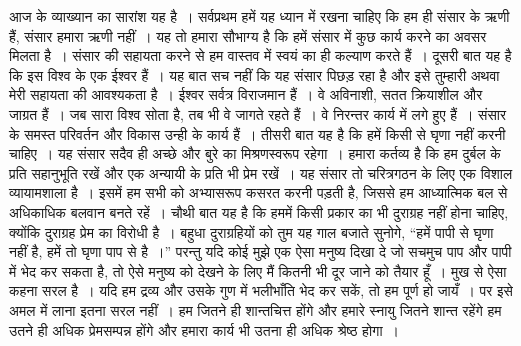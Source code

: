 आज के व्याख्यान का सारांश यह है~। सर्वप्रथम हमें यह ध्यान में रखना चाहिए कि हम ही संसार के ऋणी हैं, संसार हमारा ऋणी नहीं~। यह तो हमारा सौभाग्य है कि हमें संसार में कुछ कार्य करने का अवसर मिलता है~। संसार की सहायता करने से हम वास्तव में स्वयं का ही कल्याण करते हैं~। दूसरी बात यह है कि इस विश्व के एक ईश्वर हैं~। यह बात सच नहीं कि यह संसार पिछड़ रहा है और इसे तुम्हारी अथवा मेरी सहायता की आवश्यकता है~। ईश्वर सर्वत्र विराजमान हैं~। वे अविनाशी, सतत क्रियाशील और जाग्रत हैं~। जब सारा विश्व सोता है, तब भी वे जागते रहते हैं~। वे निरन्तर कार्य में लगे हुए हैं~। संसार के समस्त परिवर्तन और विकास उन्ही के कार्य हैं~। तीसरी बात यह है कि हमें किसी से घृणा नहीं करनी चाहिए~। यह संसार सदैव ही अच्छे और बुरे का मिश्रणस्वरूप रहेगा~। हमारा कर्तव्य है कि हम दुर्बल के प्रति सहानुभूति रखें और एक अन्यायी के प्रति भी प्रेम रखें~। यह संसार तो चरित्रगठन के लिए एक विशाल व्यायामशाला है~। इसमें हम सभी को अभ्यासरूप कसरत करनी पड़ती है, जिससे हम आध्यात्मिक बल से अधिकाधिक बलवान बनते रहें~। चौथी बात यह है कि हममें किसी प्रकार का भी दुराग्रह नहीं होना चाहिए, क्योंकि दुराग्रह प्रेम का विरोधी है~। बहुधा दुराग्रहियों को तुम यह गाल बजाते सुनोगे, “हमें पापी से घृणा नहीं है, हमें तो घृणा पाप से है~।” परन्तु यदि कोई मुझे एक ऐसा मनुष्य दिखा दे जो सचमुच पाप और पापी में भेद कर सकता है, तो ऐसे मनुष्य को देखने के लिए मैं कितनी भी दूर जाने को तैयार हूँ~। मुख से ऐसा कहना सरल है~। यदि हम द्रव्य और उसके गुण में भलीभाँति भेद कर सकें, तो हम पूर्ण हो जायँ~। पर इसे अमल में लाना इतना सरल नहीं~। हम जितने ही शान्तचित्त होंगे और हमारे स्नायु जितने शान्त रहेंगे हम उतने ही अधिक प्रेमसम्पन्न होंगे और हमारा कार्य भी उतना ही अधिक श्रेष्ठ होगा~।

